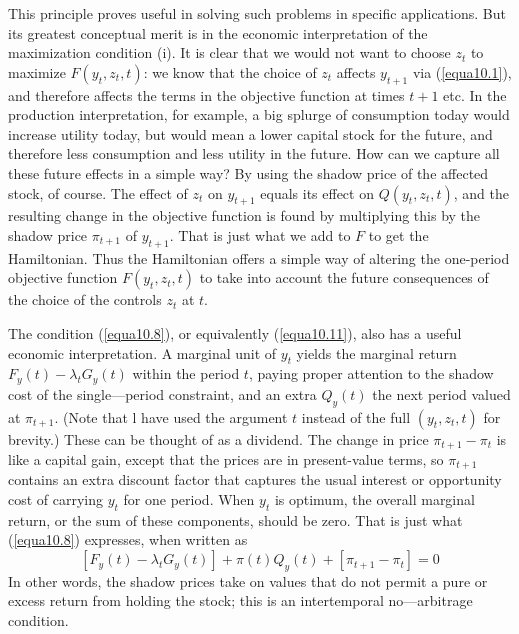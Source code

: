 This principle proves useful in solving such problems in specific applications. But its greatest conceptual merit is in the economic interpretation of the maximization condition (i). It is clear that we would not want to choose $z_t$ to maximize $F(y_t, z_t, t)$: we know that the choice of $z_t$ affects $y_{t+1}$ via (\ref{equa10.1}), and therefore affects the terms in the objective function at times $t+1$ etc. In the production interpretation, for example, a big splurge of consumption today would increase utility today, but would mean a lower capital stock for the future, and therefore less consumption and less utility in the future. How can we capture all these future effects in a simple way? By using the shadow price of the affected stock, of course. The effect of $z_t$ on $y_{t+1}$ equals its effect on $Q(y_t,z_t, t)$, and the resulting change in the objective function is found by multiplying this by the shadow price $\pi_{t+1}$ of $y_{t+1}$. That is just what we add to $F$ to get the Hamiltonian. Thus the Hamiltonian offers a simple way of altering the one-period objective function $F(y_t, z_t, t)$ to take into account the future consequences of the choice of the controls $z_t$ at $t$.

The condition (\ref{equa10.8}), or equivalently (\ref{equa10.11}), also has a useful economic interpretation. A marginal unit of $y_t$ yields the marginal return $F_y(t) - \lambda_t G_y(t)$ within the period $t$, paying proper attention to the shadow cost of the single—period constraint, and an extra $Q_y(t)$ the next period valued at $\pi_{t+1}$. (Note that l have used the
argument $t$ instead of the full $(y_t, z_t, t)$ for brevity.) These can be thought of as a dividend. The change in price $\pi_{t+1} - \pi_t $ is like a capital gain, except that the prices are in present-value terms, so $\pi_{t+1}$ contains an extra discount factor that captures the usual interest or opportunity cost of carrying $y_t$ for one period. When $y_t$ is optimum, the overall marginal return, or the sum of these components, should be zero. That is just what (\ref{equa10.8}) expresses, when written as
\begin{equation} \label{equa10.13}
[F_y(t) - \lambda_t G_y(t)] + \pi(t) Q_y(t) + [\pi_{t+1} - \pi_t] =0 
\end{equation}
In other words, the shadow prices take on values that do not permit a pure or excess return from holding the stock; this is an intertemporal no—arbitrage condition.

